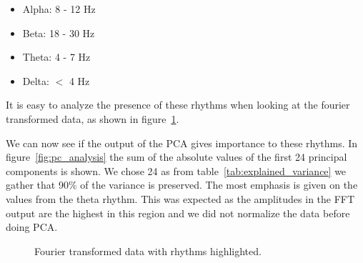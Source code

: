 \begin{itemize}
	\item Alpha: 8 - 12 Hz
	\item Beta: 18 - 30 Hz
	\item Theta: 4 - 7 Hz
	\item Delta: $<$ 4 Hz
\end{itemize}

It is easy to analyze the presence of these rhythms when looking at the fourier transformed data, as shown in figure~\ref{fig:eeg_with_rhythm}.

We can now see if the output of the PCA gives importance to these rhythms. In figure~\ref{fig:pc_analysis} the sum of the absolute values of the first 24 principal components is shown. We chose 24 as from table~\ref{tab:explained_variance} we gather that 90\% of the variance is preserved. The most emphasis is given on the values from the theta rhythm. This was expected as the amplitudes in the FFT output are the highest in this region and we did not normalize the data before doing PCA.


\newpage
\begin{figure}
	\centering	
	
	\caption{Fourier transformed data with rhythms highlighted.}
	\label{fig:eeg_with_rhythm}
\end{figure}


